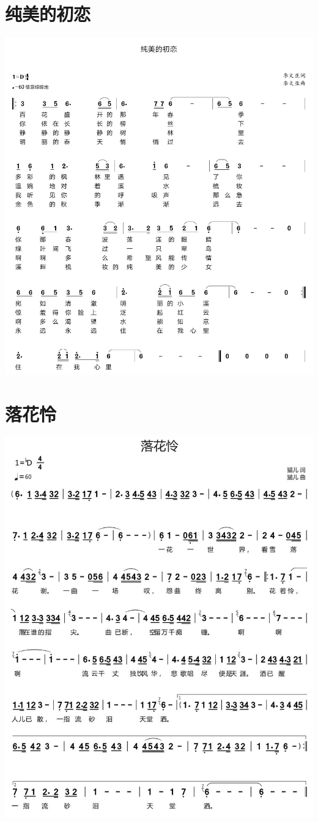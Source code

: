 \documentclass[cn,pad,twocol]{elegantbook}
\begin{document}
\section{纯美的初恋} \includegraphics[width=\textwidth]{rpi400/20210206纯美的初恋.jpg}
\section{落花怜} \includegraphics[width=\textwidth]{rpi400/20210206落花怜.png}
\end{document}

